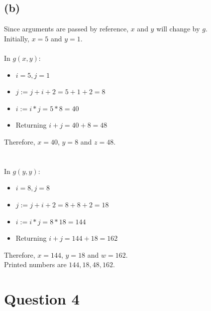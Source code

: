 \documentclass[12pt, a4paper]{article}
\begin{document}
	\subsection*{(b)}
	Since arguments are passed by reference, $x$ and $y$ will change by $g$.
	\\
	Initially, $x = 5$ and $y = 1$.
	\\\\
	In $g(x, y)$:
	\begin{itemize}
		\item $i = 5, j = 1$
		\item $j := j + i + 2 = 5 + 1 + 2 = 8$
		\item $i := i * j = 5 * 8 = 40$
		\item Returning $i + j = 40 + 8 = 48$
	\end{itemize}
	Therefore, $x = 40$, $y = 8$ and $z = 48$.\\
	\\\\
	In $g(y, y)$:
	\begin{itemize}
		\item $i = 8, j = 8$
		\item $j := j + i + 2 = 8 + 8 + 2 = 18$
		\item $i := i * j = 8 * 18 = 144$
		\item Returning $i + j = 144 + 18 = 162$
	\end{itemize}
	Therefore, $x = 144$, $y = 18$ and $w = 162$.
	\\
	Printed numbers are $144, 18, 48, 162$.
	
	\section*{Question 4}
\end{document}
